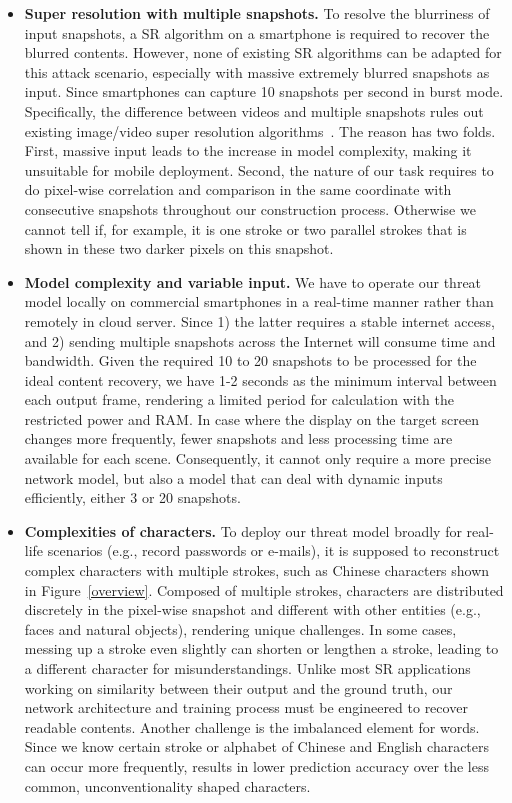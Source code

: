 \begin{itemize}[leftmargin=*]
  \item \textbf{Super resolution with multiple snapshots.} To resolve the blurriness of input snapshots, a SR algorithm on a smartphone is required to recover the blurred contents. However, none of existing SR algorithms can be adapted for this attack scenario, especially with massive extremely blurred snapshots as input. Since smartphones can capture 10 snapshots per second in burst mode. Specifically, the difference between videos and multiple snapshots rules out existing image/video super resolution algorithms~\cite{lucas2019generative,kappeler2016video}. The reason has two folds. First, massive input leads to the increase in model complexity, making it unsuitable for mobile deployment. Second, the nature of our task requires to do pixel-wise correlation and comparison in the same coordinate with consecutive snapshots throughout our construction process. Otherwise we cannot tell if, for example, it is one stroke or two parallel strokes that is shown in these two darker pixels on this snapshot.
  \item \textbf{Model complexity and variable input.} We have to operate our threat model locally on commercial smartphones in a real-time manner rather than remotely in cloud server. Since 1) the latter requires a stable internet access, and 2) sending multiple snapshots across the Internet will consume time and bandwidth. Given the required 10 to 20 snapshots to be processed for the ideal content recovery, we have 1-2 seconds as the minimum interval between each output frame, rendering a limited period for calculation with the restricted power and RAM. In case where the display on the target screen changes more frequently, fewer snapshots and less processing time are available for each scene. Consequently, it cannot only require a more precise network model, but also a model that can deal with dynamic inputs efficiently, either 3 or 20 snapshots.
  \item \textbf{Complexities of characters.} To deploy our threat model broadly for real-life scenarios (e.g., record passwords or e-mails), it is supposed to reconstruct complex characters with multiple strokes, such as Chinese characters shown in Figure~\ref{overview}. Composed of multiple strokes, characters are distributed discretely in the pixel-wise snapshot and different with other entities (e.g., faces and natural objects), rendering unique challenges. In some cases, messing up a stroke even slightly can shorten or lengthen a stroke, leading to a different character for misunderstandings. Unlike most SR applications working on similarity between their output and the ground truth, our network architecture and training process must be engineered to recover readable contents. Another challenge is the imbalanced element for words. Since we know certain stroke or alphabet of Chinese and English characters can occur more frequently, results in lower prediction accuracy over the less common, unconventionality shaped characters.
\end{itemize}

